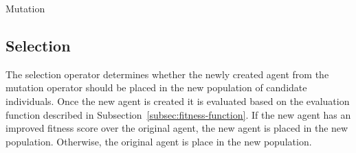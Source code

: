 \begin{algorithm}
	\caption{Mutation}
	\label{alg:de-mutation}
	\begin{algorithmic}

				\ELSE
				\ENDIF
			\ENDFOR
			\ENDIF
		\ENDFOR

	\end{algorithmic}
\end{algorithm}

\subsection{Selection}
\label{subsec:de-selection}

The selection operator determines whether the newly created agent from the mutation operator should be placed in the new population of candidate individuals. Once the new agent is created it is evaluated based on the evaluation function described in Subsection~\ref{subsec:fitness-function}. If the new agent has an improved fitness score over the original agent, the new agent is placed in the new population. Otherwise, the original agent is place in the new population.
